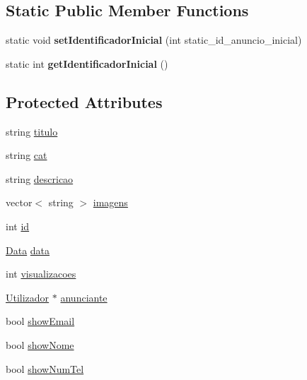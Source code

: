 \subsection*{Static Public Member Functions}
\begin{DoxyCompactItemize}
\item 
\hypertarget{class_anuncio_a72be682197152f53d10c529f54d64a82}{}static void {\bfseries set\+Identificador\+Inicial} (int static\+\_\+id\+\_\+anuncio\+\_\+inicial)\label{class_anuncio_a72be682197152f53d10c529f54d64a82}

\item 
\hypertarget{class_anuncio_aaf0e8f815e3e2143784050ededd4c75c}{}static int {\bfseries get\+Identificador\+Inicial} ()\label{class_anuncio_aaf0e8f815e3e2143784050ededd4c75c}

\end{DoxyCompactItemize}
\subsection*{Protected Attributes}
\begin{DoxyCompactItemize}
\item 
string \hyperlink{class_anuncio_adb34bedd8220f42b9ee37662c21313e6}{titulo}
\item 
string \hyperlink{class_anuncio_af1c4333f338e4b5ff84041d1a4ba0033}{cat}
\item 
string \hyperlink{class_anuncio_aa6a9eb8d08cb06d16061b006eb2c8b97}{descricao}
\item 
vector$<$ string $>$ \hyperlink{class_anuncio_a9ff3646a44a2e285d082682e37631ac7}{imagens}
\item 
int \hyperlink{class_anuncio_a42900203e39da639a1128277dbd96baf}{id}
\item 
\hyperlink{class_data}{Data} \hyperlink{class_anuncio_a2c35b71b56332894a705eb2770d5102b}{data}
\item 
int \hyperlink{class_anuncio_ae3fb8cd61ec06485ee166cd3b5d80804}{visualizacoes}
\item 
\hyperlink{class_utilizador}{Utilizador} $\ast$ \hyperlink{class_anuncio_ac89450835a3cd86dac14bda6dfd83934}{anunciante}
\item 
bool \hyperlink{class_anuncio_a6a41218c0a11ba393522d3a9a80ded95}{show\+Email}
\item 
bool \hyperlink{class_anuncio_a50feea41d2253cd5168243b18fa03aa6}{show\+Nome}
\item 
bool \hyperlink{class_anuncio_a8db5dc7339e63974c643a6602f2cf7bc}{show\+Num\+Tel}
\end{DoxyCompactItemize}
